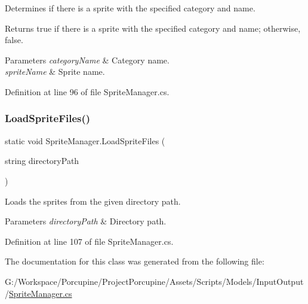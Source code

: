 Determines if there is a sprite with the specified category and name. 

\begin{DoxyReturn}{Returns}
{\ttfamily true} if there is a sprite with the specified category and name; otherwise, {\ttfamily false}.
\end{DoxyReturn}

\begin{DoxyParams}{Parameters}
{\em category\+Name} & Category name.\\
\hline
{\em sprite\+Name} & Sprite name.\\
\hline
\end{DoxyParams}


Definition at line 96 of file Sprite\+Manager.\+cs.

\mbox{\label{class_sprite_manager_aa42d46dc8725b403f8c0d54830209e35}} 
\subsubsection{\texorpdfstring{Load\+Sprite\+Files()}{LoadSpriteFiles()}}
{\footnotesize\ttfamily static void Sprite\+Manager.\+Load\+Sprite\+Files (\begin{DoxyParamCaption}\item[{string}]{directory\+Path }\end{DoxyParamCaption})\hspace{0.3cm}{\ttfamily [static]}}



Loads the sprites from the given directory path. 


\begin{DoxyParams}{Parameters}
{\em directory\+Path} & Directory path.\\
\hline
\end{DoxyParams}


Definition at line 107 of file Sprite\+Manager.\+cs.



The documentation for this class was generated from the following file\+:\begin{DoxyCompactItemize}
\item 
G\+:/\+Workspace/\+Porcupine/\+Project\+Porcupine/\+Assets/\+Scripts/\+Models/\+Input\+Output/\hyperlink{_sprite_manager_8cs}{Sprite\+Manager.\+cs}\end{DoxyCompactItemize}
